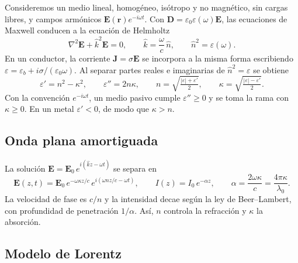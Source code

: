 \documentclass[11pt,letterpaper]{article}
\newcommand{\nh}{\hat{n}}
\newcommand{\kh}{\hat{k}}
\newcommand{\eps}{\varepsilon}
\begin{document}
Consideremos un medio lineal, homogéneo, isótropo y no magnético, sin cargas
libres, y campos armónicos $\mathbf{E}(\mathbf{r})e^{-i\omega t}$. Con
$\mathbf{D}=\eps_0\eps(\omega)\mathbf{E}$, las ecuaciones de Maxwell conducen a
la ecuación de Helmholtz
\begin{equation}\label{eq:helmholtz}
  \nabla^2\mathbf{E}+\kh^2\mathbf{E}=0,\qquad \kh=\frac{\omega}{c}\,\nh,
  \qquad \nh^2=\eps(\omega).
\end{equation}
En un conductor, la corriente $\mathbf{J}=\sigma\mathbf{E}$ se incorpora a la
misma forma escribiendo $\eps=\eps_b+i\sigma/(\eps_0\omega)$. Al separar partes
reales e imaginarias de $\nh^2=\eps$ se obtiene
\begin{equation}\label{eq:nkappa}
  \eps'=n^2-\kappa^2,\qquad \eps''=2n\kappa,\qquad
  n=\sqrt{\tfrac{|\eps|+\eps'}{2}},\qquad
  \kappa=\sqrt{\tfrac{|\eps|-\eps'}{2}}.
\end{equation}
Con la convención $e^{-i\omega t}$, un medio pasivo cumple $\eps''\ge0$ y se
toma la rama con $\kappa\ge0$. En un metal $\eps'<0$, de modo que $\kappa>n$.

\subsection{Onda plana amortiguada}

La solución $\mathbf{E}=\mathbf{E}_0\,e^{i(\kh z-\omega t)}$ se separa en
\begin{equation}\label{eq:beer}
  \mathbf{E}(z,t)=\mathbf{E}_0\,e^{-\omega\kappa z/c}\,e^{i(\omega nz/c-\omega t)},
  \qquad I(z)=I_0\,e^{-\alpha z},\qquad
  \alpha=\frac{2\omega\kappa}{c}=\frac{4\pi\kappa}{\lambda_0}.
\end{equation}
La velocidad de fase es $c/n$ y la intensidad decae según la ley de
Beer--Lambert, con profundidad de penetración $1/\alpha$. Así, $n$ controla la
refracción y $\kappa$ la absorción.

\subsection{Modelo de Lorentz}
\end{document}
